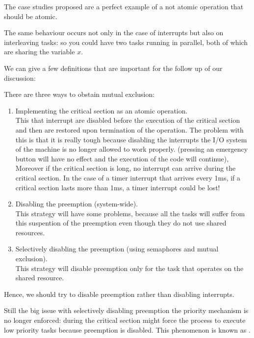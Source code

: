 The case studies proposed are a perfect example of a not atomic operation that should be atomic.

The same behaviour occurs not only in the case of interrupts but also on interleaving tasks: so you could have two tasks running in parallel, both of which are sharing the variable $x$.

We can give a few definitions that are important for the follow up of our discussion:

There are three ways to obstain mutual exclusion:
\begin{enumerate}
    \item Implementing the critical section as an atomic operation.\\
    This that interrupt are disabled before the execution of the critical section and then are restored upon termination of the operation. The problem with this is that it is really tough because disabling the interrupts the I/O system of the machine is no longer allowed to work properly. (pressing an emergency button will have no effect and the execution of the code will continue),\\
    Moreover if the critical section is long, no interrupt can arrive during the critical section. In the case of a timer interrupt that arrives every 1ms, if a critical section lasts more than 1ms, a timer interrupt could be lost!
    \item Disabling the preemption (system-wide).\\
    This strategy will have some problems, because all the tasks will suffer from this suspention of the preemption even though they do not use shared resources.
    \item Selectively disabling the preemption (using semaphores and mutual exclusion).\\
    This strategy will disable preemption only for the task that operates on the shared resource.
\end{enumerate}
Hence, we should try to disable preemption rather than disabling interrupts.

Still the big issue with selectively disabling preemption the priority mechanism is no longer enforced: during the critical section might force the process to execute low priority tasks because preemption is disabled. This phenomenon is known as .

